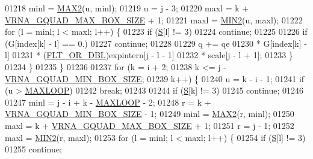 \begin{DoxyCode}
01218       minl  = \mbox{\hyperlink{group__utils_ga33297b3679c713b0c4d897cd0fe3b122}{MAX2}}(u, minl);
01219       u     = j - 3;
01220       maxl  = k + \mbox{\hyperlink{group__energy__parameters_ga56cafabad2f8a7db83f2d5d3b0e8d313}{VRNA\_GQUAD\_MAX\_BOX\_SIZE}} + 1;
01221       maxl  = \mbox{\hyperlink{group__utils_gae0b9cd0ce090bd69b951aa73e8fa4f7d}{MIN2}}(u, maxl);
01222       \textcolor{keywordflow}{for} (l = minl; l < maxl; l++) \{
01223         \textcolor{keywordflow}{if} (\mbox{\hyperlink{group__energy__parameters__rw_gga7bf2bb363bcf5ce50d60255d256e5682af1ce01387d2348f8b858721a7db81670}{S}}[l] != 3)
01224           \textcolor{keywordflow}{continue};
01225 
01226         \textcolor{keywordflow}{if} (G[index[k] - l] == 0.)
01227           \textcolor{keywordflow}{continue};
01228 
01229         q += qe
01230              * G[index[k] - l]
01231              * (\mbox{\hyperlink{group__data__structures_ga31125aeace516926bf7f251f759b6126}{FLT\_OR\_DBL}})expintern[j - l - 1]
01232              * scale[j - l + 1];
01233       \}
01234     \}
01235   \}
01236 
01237   \textcolor{keywordflow}{for} (k = i + 2;
01238        k <= j - \mbox{\hyperlink{group__energy__parameters_gad7bdd880afca461f97763d79ee57a347}{VRNA\_GQUAD\_MIN\_BOX\_SIZE}};
01239        k++) \{
01240     u = k - i - 1;
01241     \textcolor{keywordflow}{if} (u > \mbox{\hyperlink{energy__const_8h_ad1bd6eabac419670ddd3c9ed82145988}{MAXLOOP}})
01242       \textcolor{keywordflow}{break};
01243 
01244     \textcolor{keywordflow}{if} (\mbox{\hyperlink{group__energy__parameters__rw_gga7bf2bb363bcf5ce50d60255d256e5682af1ce01387d2348f8b858721a7db81670}{S}}[k] != 3)
01245       \textcolor{keywordflow}{continue};
01246 
01247     minl  = j - i + k - \mbox{\hyperlink{energy__const_8h_ad1bd6eabac419670ddd3c9ed82145988}{MAXLOOP}} - 2;
01248     r     = k + \mbox{\hyperlink{group__energy__parameters_gad7bdd880afca461f97763d79ee57a347}{VRNA\_GQUAD\_MIN\_BOX\_SIZE}} - 1;
01249     minl  = \mbox{\hyperlink{group__utils_ga33297b3679c713b0c4d897cd0fe3b122}{MAX2}}(r, minl);
01250     maxl  = k + \mbox{\hyperlink{group__energy__parameters_ga56cafabad2f8a7db83f2d5d3b0e8d313}{VRNA\_GQUAD\_MAX\_BOX\_SIZE}} + 1;
01251     r     = j - 1;
01252     maxl  = \mbox{\hyperlink{group__utils_gae0b9cd0ce090bd69b951aa73e8fa4f7d}{MIN2}}(r, maxl);
01253     \textcolor{keywordflow}{for} (l = minl; l < maxl; l++) \{
01254       \textcolor{keywordflow}{if} (\mbox{\hyperlink{group__energy__parameters__rw_gga7bf2bb363bcf5ce50d60255d256e5682af1ce01387d2348f8b858721a7db81670}{S}}[l] != 3)
01255         \textcolor{keywordflow}{continue};

\end{DoxyCode}
